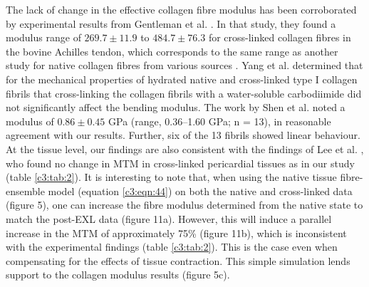     
    The lack of change in the effective collagen fibre modulus has been corroborated by experimental results from Gentleman et al. \cite{gentleman_mechanical_2003}. In that study, they found a modulus range of $269.7\pm11.9$ to $ 484.7\pm76.3$ for cross-linked collagen fibres in the bovine Achilles tendon, which corresponds to the same range as another study for native collagen fibres from various sources \cite{eppell_nano_2006}. Yang et al. \cite{yang_mechanical_2008}\cite{yang_micromechanical_2007} determined that for the mechanical properties of hydrated native and cross-linked type I collagen fibrils that cross-linking the collagen fibrils with a water-soluble carbodiimide did not significantly affect the bending modulus. The work by Shen et al. \cite{shen_stress_2008} noted a modulus of $0.86\pm0.45$ GPa (range, 0.36–1.60 GPa; n = 13), in reasonable agreement with our results. Further, six of the 13 fibrils showed linear behaviour. At the tissue level, our findings are also consistent with the findings of Lee et al. \cite{lee_bovine_1989I}\cite{lee_bovine_1989II}\cite{lee_bovine_1989III}, who found no change in MTM in cross-linked pericardial tissues as in our study (table \ref{c3:tab:2}). It is interesting to note that, when using the native tissue fibre-ensemble model (equation \ref{c3:eqn:44}) on both the native and cross-linked data (figure 5), one can increase the fibre modulus determined from the native state to match the post-EXL data (figure 11a). However, this will induce a parallel increase in the MTM of approximately 75\% (figure 11b), which is inconsistent with the experimental findings (table \ref{c3:tab:2}). This is the case even when compensating for the effects of tissue contraction. This simple simulation lends support to the collagen modulus results (figure 5c).
    
